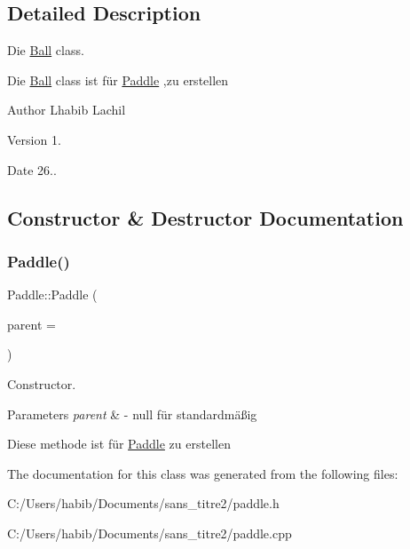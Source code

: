 \subsection{Detailed Description}
Die \hyperlink{class_ball}{Ball} class. 

Die \hyperlink{class_ball}{Ball} class ist für \hyperlink{class_paddle}{Paddle} ,zu erstellen \begin{DoxyAuthor}{Author}
Lhabib Lachil 
\end{DoxyAuthor}
\begin{DoxyVersion}{Version}
1. 
\end{DoxyVersion}
\begin{DoxyDate}{Date}
26.. 
\end{DoxyDate}


\subsection{Constructor \& Destructor Documentation}
\mbox{\label{class_paddle_ab8dfa8e73e79ae577fcd90bc7016aef0}} 
\subsubsection{\texorpdfstring{Paddle()}{Paddle()}}
{\footnotesize\ttfamily Paddle\+::\+Paddle (\begin{DoxyParamCaption}\item[{Q\+Graphics\+Item $\ast$}]{parent = {} }\end{DoxyParamCaption})}



Constructor. 


\begin{DoxyParams}{Parameters}
{\em parent} & -\/ null für standardmäßig\\
\hline
\end{DoxyParams}
Diese methode ist für \hyperlink{class_paddle}{Paddle} zu erstellen 

The documentation for this class was generated from the following files\+:\begin{DoxyCompactItemize}
\item 
C\+:/\+Users/habib/\+Documents/sans\+\_\+titre2/paddle.\+h\item 
C\+:/\+Users/habib/\+Documents/sans\+\_\+titre2/paddle.\+cpp\end{DoxyCompactItemize}
